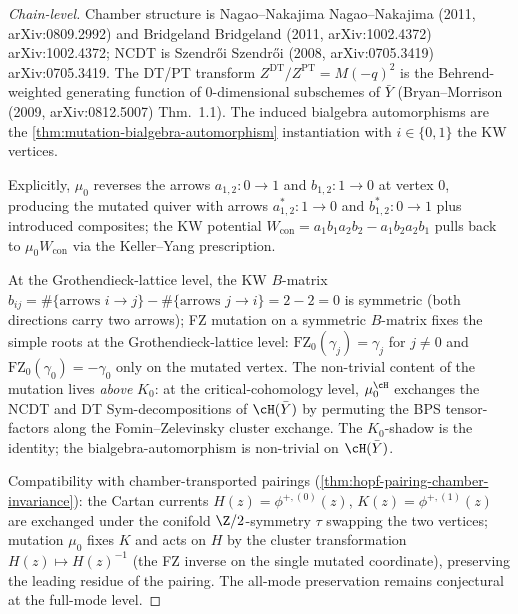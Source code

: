\begin{proof}[Chain-level]
 Chamber structure is Nagao--Nakajima Nagao--Nakajima (2011, arXiv:0809.2992)
 and Bridgeland Bridgeland (2011, arXiv:1002.4372) arXiv:1002.4372; NCDT is
 Szendr\H{o}i Szendr\H{o}i (2008, arXiv:0705.3419) arXiv:0705.3419. The DT/PT transform
 $Z^{\mathrm{DT}}/Z^{\mathrm{PT}} = M(-q)^2$ is the Behrend-weighted generating
 function of $0$-dimensional subschemes of $\bar{Y}$
 (Bryan--Morrison (2009, arXiv:0812.5007) Thm.~1.1). The
 induced bialgebra automorphisms are the
 \cref{thm:mutation-bialgebra-automorphism} instantiation with
 $i \in \{0, 1\}$ the KW vertices.

 Explicitly, $\mu_0$ reverses the arrows $a_{1,2}\colon 0 \to 1$ and
 $b_{1,2}\colon 1 \to 0$ at vertex $0$, producing the mutated quiver
 with arrows $a_{1,2}^*\colon 1 \to 0$ and $b_{1,2}^*\colon 0 \to 1$
 plus introduced composites; the KW potential
 $W_{\mathrm{con}} = a_1 b_1 a_2 b_2 - a_1 b_2 a_2 b_1$ pulls back to
 $\mu_0 W_{\mathrm{con}}$ via the Keller--Yang prescription.

 At the Grothendieck-lattice level, the KW $B$-matrix
 $b_{ij} = \#\{\text{arrows } i \to j\} - \#\{\text{arrows } j \to i\} = 2 - 2 = 0$
 is symmetric (both directions carry two arrows); FZ mutation
 on a symmetric $B$-matrix fixes the simple roots at the Grothendieck-lattice
 level: $\mathrm{FZ}_0(\gamma_j) = \gamma_j$ for $j \neq 0$ and
 $\mathrm{FZ}_0(\gamma_0) = -\gamma_0$ only on the mutated vertex. The
 non-trivial content of the mutation lives \emph{above} $K_0$: at the
 critical-cohomology level, $\mu_0^\cH$ exchanges the NCDT and DT
 Sym-decompositions of $\cH(\bar Y)$ by permuting the BPS
 tensor-factors along the Fomin--Zelevinsky cluster exchange. The
 $K_0$-shadow is the identity; the bialgebra-automorphism is
 non-trivial on $\cH(\bar Y)$.

 Compatibility with chamber-transported pairings
 (\cref{thm:hopf-pairing-chamber-invariance}): the Cartan currents
 $H(z) = \phi^{+,(0)}(z)$, $K(z) = \phi^{+,(1)}(z)$ are exchanged
 under the conifold $\Z/2$-symmetry $\tau$ swapping the two vertices;
 mutation $\mu_0$ fixes $K$ and acts on $H$ by the cluster
 transformation $H(z) \mapsto H(z)^{-1}$ (the FZ inverse on the
 single mutated coordinate), preserving the leading residue of the
 pairing. The all-mode preservation remains conjectural at the full-mode level.
\end{proof}

